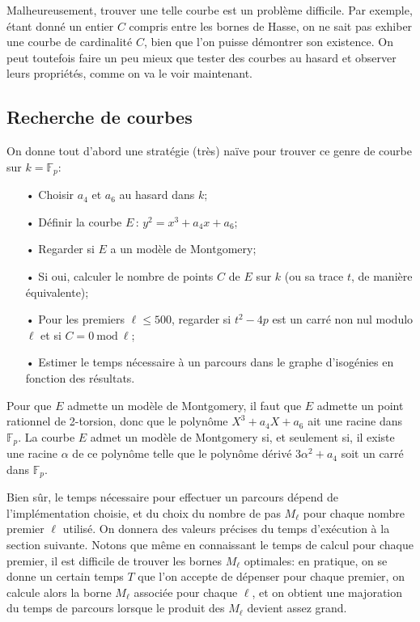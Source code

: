 \documentclass[11pt,a4paper]{article}
\newcommand{\F}{\mathbb{F}}
\newcommand{\de}{\,:\,}
\renewcommand{\mod}{\ \mathrm{mod}\ }
\theoremstyle{definition}
\begin{document}
Malheureusement, trouver une telle courbe est un problème difficile. Par exemple, étant donné un entier $C$ compris entre les bornes de Hasse, on ne sait pas exhiber une courbe de cardinalité $C$, bien que l'on puisse démontrer son existence. On peut toutefois faire un peu mieux que tester des courbes au hasard et observer leurs propriétés, comme on va le voir maintenant.

\subsection{Recherche de courbes}

On donne tout d'abord une stratégie (très) naïve pour trouver ce genre de courbe sur $k = \F_p$:
\begin{itemize}
\item[•] Choisir $a_4$ et $a_6$ au hasard dans $k$;
\item[•] Définir la courbe $E\de y^2 = x^3 + a_4x + a_6$;
\item[•] Regarder si $E$ a un modèle de Montgomery;
\item[•] Si oui, calculer le nombre de points $C$ de $E$ sur $k$ (ou sa trace $t$, de manière équivalente);
\item[•] Pour les premiers $\ell\leq 500$, regarder si $t^2 - 4p$ est un carré non nul modulo $\ell$ et si $C = 0 \mod\ell$;
\item[•] Estimer le temps nécessaire à un parcours dans le graphe d'isogénies en fonction des résultats.
\end{itemize}

Pour que $E$ admette un modèle de Montgomery, il faut que $E$ admette un point rationnel de 2-torsion, donc que le polynôme $X^3 + a_4 X + a_6$ ait une racine dans $\F_p$. La courbe $E$ admet un modèle de Montgomery si, et seulement si, il existe une racine $\alpha$ de ce polynôme telle que le polynôme dérivé $3\alpha^2 + a_4$ soit un carré dans $\F_p$.

Bien sûr, le temps nécessaire pour effectuer un parcours dépend de l'implémentation choisie, et du choix du nombre de pas $M_\ell$ pour chaque nombre premier $\ell$ utilisé. On donnera des valeurs précises du temps d'exécution à la section suivante. Notons que même en connaissant le temps de calcul pour chaque premier, il est difficile de trouver les bornes $M_\ell$ optimales: en pratique, on se donne un certain temps $T$ que l'on accepte de dépenser pour chaque premier, on calcule alors la borne $M_\ell$ associée pour chaque $\ell$, et on obtient une majoration du temps de parcours lorsque le produit des $M_\ell$ devient assez grand.
\end{document}
